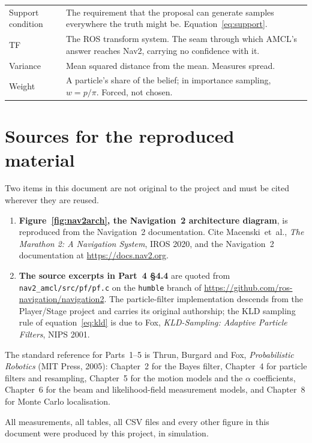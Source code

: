 \documentclass[11pt,a4paper]{report}
\newcommand{\file}[1]{\texttt{\small #1}}
\begin{document}
\begin{longtable}{@{}p{}p{}@{}}
Support condition & The requirement that the proposal can generate samples
  everywhere the truth might be. Equation~\eqref{eq:support}. \\
TF & The ROS transform system. The seam through which AMCL's answer reaches
  Nav2, carrying no confidence with it. \\
Variance & Mean squared distance from the mean. Measures spread. \\
Weight & A particle's share of the belief; in importance sampling,
  $w = p / \pi$. Forced, not chosen. \\
\bottomrule
\end{longtable}

\chapter*{Sources for the reproduced material}

Two items in this document are not original to the project and must be cited
wherever they are reused.

\begin{enumerate}[leftmargin=1.6em,itemsep=5pt]
\item \textbf{Figure~\ref{fig:nav2arch}, the Navigation~2 architecture
diagram}, is reproduced from the Navigation~2 documentation. Cite
Macenski~et~al., \emph{The Marathon 2: A Navigation System}, IROS 2020, and the
Navigation~2 documentation at \url{https://docs.nav2.org}.

\item \textbf{The source excerpts in Part~4 \S4.4} are quoted from
\file{nav2\_amcl/src/pf/pf.c} on the \texttt{humble} branch of
\url{https://github.com/ros-navigation/navigation2}. The particle-filter
implementation descends from the Player/Stage project and carries its original
authorship; the KLD sampling rule of equation~\eqref{eq:kld} is due to Fox,
\emph{KLD-Sampling: Adaptive Particle Filters}, NIPS 2001.
\end{enumerate}

\noindent The standard reference for Parts~1--5 is Thrun, Burgard and Fox,
\emph{Probabilistic Robotics} (MIT Press, 2005): Chapter~2 for the Bayes
filter, Chapter~4 for particle filters and resampling, Chapter~5 for the
motion models and the $\alpha$ coefficients, Chapter~6 for the beam and
likelihood-field measurement models, and Chapter~8 for Monte Carlo
localisation.

\medskip
\noindent All measurements, all tables, all CSV files and every other figure in
this document were produced by this project, in simulation.
\end{document}
